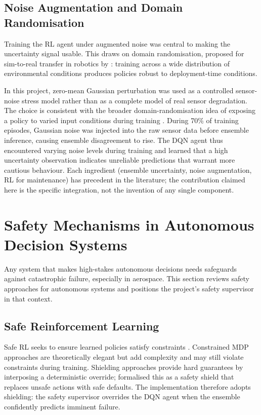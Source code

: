 \documentclass[12pt,a4paper]{report}
\begin{document}
\subsection{Noise Augmentation and Domain Randomisation}

Training the RL agent under augmented noise was central to making the uncertainty signal usable. This draws on domain randomisation, proposed for sim-to-real transfer in robotics by \citet{tobin2017domain}: training across a wide distribution of environmental conditions produces policies robust to deployment-time conditions.


In this project, zero-mean Gaussian perturbation was used as a controlled sensor-noise stress model rather than as a complete model of real sensor degradation. The choice is consistent with the broader domain-randomisation idea of exposing a policy to varied input conditions during training \citep{tobin2017domain}. During 70\% of training episodes, Gaussian noise was injected into the raw sensor data before ensemble inference, causing ensemble disagreement to rise. The DQN agent thus encountered varying noise levels during training and learned that a high uncertainty observation indicates unreliable predictions that warrant more cautious behaviour. Each ingredient (ensemble uncertainty, noise augmentation, RL for maintenance) has precedent in the literature; the contribution claimed here is the specific integration, not the invention of any single component.

\section{Safety Mechanisms in Autonomous Decision Systems}

Any system that makes high-stakes autonomous decisions needs safeguards against catastrophic failure, especially in aerospace. This section reviews safety approaches for autonomous systems and positions the project's safety supervisor in that context.

\subsection{Safe Reinforcement Learning}

Safe RL seeks to ensure learned policies satisfy constraints \citep{garcia2015comprehensive}. Constrained MDP approaches \citep{tessler2018reward} are theoretically elegant but add complexity and may still violate constraints during training. Shielding approaches provide hard guarantees by interposing a deterministic override; \citet{alshiekh2018safe} formalised this as a safety shield that replaces unsafe actions with safe defaults. The implementation therefore adopts shielding: the safety supervisor overrides the DQN agent when the ensemble confidently predicts imminent failure.
\end{document}
